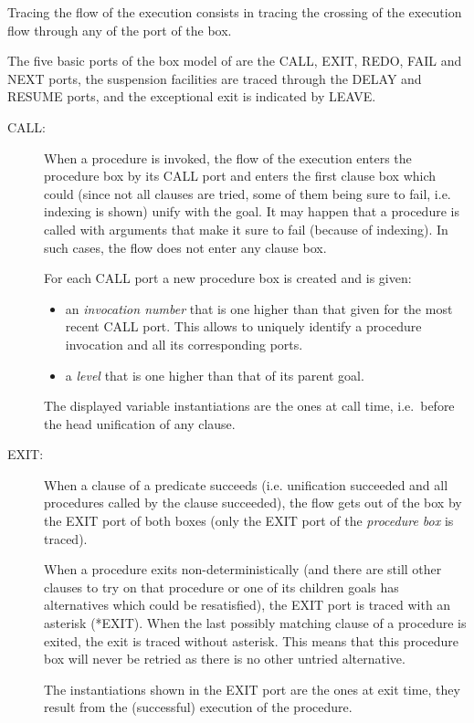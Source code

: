 Tracing the flow of the execution consists in tracing the crossing of
the execution flow through any of the port of the box.

The five basic ports of the box model of {\eclipse} are the CALL, EXIT,
REDO, FAIL and NEXT ports, the suspension facilities are traced through
the DELAY and RESUME ports, and the exceptional exit is indicated by LEAVE.

\begin{description}

\item[CALL:] When a procedure is invoked, the flow of the execution
enters the procedure box by its CALL port and enters the first clause
box which could (since not all clauses are tried, some of them being
sure to fail, i.e. indexing is shown) unify with the goal.
It may happen that a procedure is
called with arguments that make it sure to fail (because of
indexing). In such cases, the flow does not enter any clause box.

For each CALL port a new procedure box is created and is given:
\begin{itemize}
\item an {\it invocation number} that is one higher than that given for
the most recent CALL port. This allows to uniquely identify a
procedure invocation and all its corresponding ports.

\item a {\it level} that is one higher than that of its parent goal.
\end{itemize}

The displayed variable instantiations are the ones at call time,
i.e.\ before the head unification of any clause.

\item[EXIT:] When a clause of a predicate succeeds (i.e. unification
succeeded and all procedures called by the clause succeeded),
the flow gets out of the box by the EXIT port of both boxes (only
the EXIT port of the {\it procedure box} is traced).

When a procedure exits non-deterministically (and there are still
other clauses to try on that procedure or one of its children goals
has alternatives which could be resatisfied), the EXIT port is traced
with an asterisk (*EXIT). When the last possibly matching clause of a
procedure is exited, the exit is traced without asterisk. This means
that this procedure box will never be retried as there is no other
untried alternative.

The instantiations shown in the EXIT port are the ones at exit time,
they result from the (successful) execution of the procedure.


\end{description}
